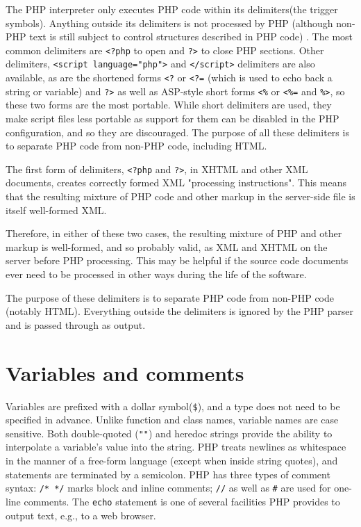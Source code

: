 The PHP interpreter only executes PHP code within its delimiters(the trigger symbols). Anything outside its delimiters is not processed by PHP (although non-PHP text is still subject to control structures described in PHP code) . The most common delimiters are \texttt{<?php} to open and \texttt{?>} to close PHP sections.  Other delimiters, \texttt{<script language="php">} and \texttt{</script>} delimiters are also available, as are the shortened forms \texttt{<?} or \texttt{<?=} (which is used to echo back a string or variable) and \texttt{?>} as well as ASP-style short forms \texttt{<\%} or \texttt{<\%=} and \texttt{\%>}, so these two forms are the most portable. While short delimiters are used, they make script files less portable as support for them can be disabled in the PHP configuration, and so they are discouraged. The purpose of all these delimiters is to separate PHP code from non-PHP code, including HTML.



The first form of delimiters, \texttt{<?php} and \texttt{?>}, in XHTML and other XML documents, creates correctly formed XML "processing instructions". This means that the resulting mixture of PHP code and other markup in the server-side file is itself well-formed XML.

Therefore, in either of these two cases, the resulting mixture of PHP and other markup is well-formed, and so probably valid, as XML and XHTML on the server before PHP processing. This may be helpful if the source code documents ever need to be processed in other ways during the life of the software.

The purpose of these delimiters is to separate PHP code from non-PHP code (notably HTML). Everything outside the delimiters is ignored by the PHP parser and is passed through as output.



\section{Variables and comments}





Variables are prefixed with a dollar symbol(\texttt{\$}), and a type does not need to be specified in advance. Unlike function and class names, variable names are case sensitive. Both double-quoted (\texttt{""}) and heredoc strings provide the ability to interpolate a variable's value into the string. PHP treats newlines as whitespace in the manner of a free-form language (except when inside string quotes), and statements are terminated by a semicolon. PHP has three types of comment syntax: \texttt{/* */} marks block and inline comments; \texttt{//} as well as \texttt{\#} are used for one-line comments. The \texttt{echo} statement is one of several facilities PHP provides to output text, e.g., to a web browser.



